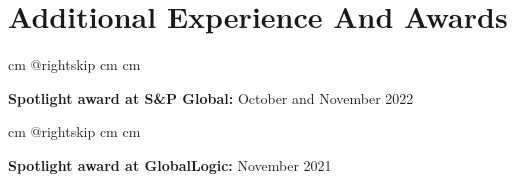\documentclass[10pt, letterpaper]{article}
\begin{document}
    
    \section{Additional Experience And Awards}

        \begingroup{} cm
        \advance\csname @rightskip cm
        \advance{} cm

        \textbf{Spotlight award at S\&P Global:} October and November 2022 \par\endgroup

        \vspace{0.2 cm}
        \begingroup{} cm
        \advance\csname @rightskip cm
        \advance{} cm

        \textbf{Spotlight award at GlobalLogic:} November 2021 \par\endgroup


    
\end{document}
